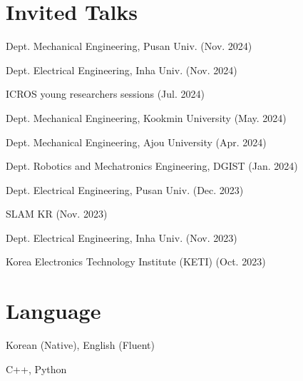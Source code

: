 \documentclass[margin]{res}
\begin{document}
\begin{resume}
		\section{Invited Talks}
		\par Dept. Mechanical Engineering, Pusan Univ. (Nov. 2024)
		\par Dept. Electrical Engineering, Inha Univ. (Nov. 2024)
		\par ICROS young researchers sessions (Jul. 2024)
		\par Dept. Mechanical Engineering, Kookmin University (May. 2024)
		\par Dept. Mechanical Engineering, Ajou University (Apr. 2024)
		\par Dept. Robotics and Mechatronics Engineering, DGIST (Jan. 2024)
		\par Dept. Electrical Engineering, Pusan Univ. (Dec. 2023)
		\par SLAM KR (Nov. 2023)
		\par Dept. Electrical Engineering, Inha Univ. (Nov. 2023)
		\par Korea Electronics Technology Institute (KETI) (Oct. 2023)
		
		\section{Language}
		\par Korean (Native), English (Fluent)
		\par C++, Python
				
	\end{resume}
\end{document}
